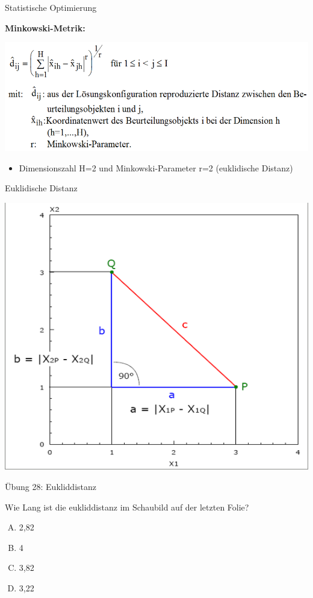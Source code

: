 \documentclass[12pt,ngerman,a4paper,ignorenonframetext,]{beamer}
\providecommand{\tightlist}{%
  \setlength{\itemsep}{0pt}\setlength{\parskip}{0pt}}
\begin{document}
\begin{frame}{Statistische Optimierung}
\protect\hypertarget{statistische-optimierung-1}{}

\textbf{Minkowski-Metrik:}

\begin{center}\includegraphics[width=0.7\linewidth]{./images/Marketingcontrolling/Minkowski} \end{center}

\begin{itemize}
\tightlist
\item
  Dimensionszahl H=2 und Minkowski-Parameter r=2 (euklidische Distanz)
\end{itemize}

\end{frame}

\begin{frame}{Euklidische Distanz}
\protect\hypertarget{euklidische-distanz}{}

\begin{center}\includegraphics[width=0.5\linewidth]{./images/Marketingcontrolling/Euklid} \end{center}

\end{frame}

\begin{frame}{Übung 28: Eukliddistanz}
\protect\hypertarget{ubung-28-eukliddistanz}{}

Wie Lang ist die eukliddistanz im Schaubild auf der letzten Folie?

\begin{enumerate}
[A.]
\tightlist
\item
  2,82
\item
  4
\item
  3,82
\item
  3,22
\end{enumerate}


\end{frame}
\end{document}
